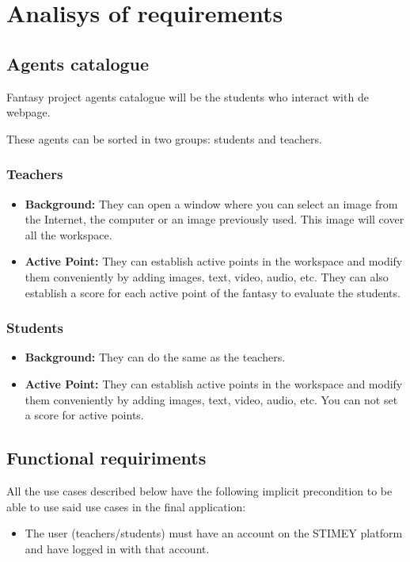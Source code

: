 \chapter{Analisys of requirements}
\section{Agents catalogue}
Fantasy project agents catalogue will be the students who interact with de webpage.

These agents can be sorted in two groups: students and teachers.

\subsection{Teachers}
\begin{itemize}
	\item \textbf{Background:} They can open a window where you can select an image from the Internet, the computer or an image previously used. This image will cover all the workspace.
	\item \textbf{Active Point:} They can establish active points in the workspace and modify them conveniently by adding images, text, video, audio, etc. They can also establish a score for each active point of the fantasy to evaluate the students.
\end{itemize}

\subsection{Students}
\begin{itemize}
	\item \textbf{Background:} They can do the same as the teachers.
	\item \textbf{Active Point:} They can establish active points in the workspace and modify them conveniently by adding images, text, video, audio, etc. You can not set a score for active points.
\end{itemize}

\section{Functional requiriments}
All the use cases described below have the following implicit precondition to be able to use said use cases in the final application:
\begin{itemize}
	\item The user (teachers/students) must have an account on the STIMEY platform and have logged in with that account.
\end{itemize}

